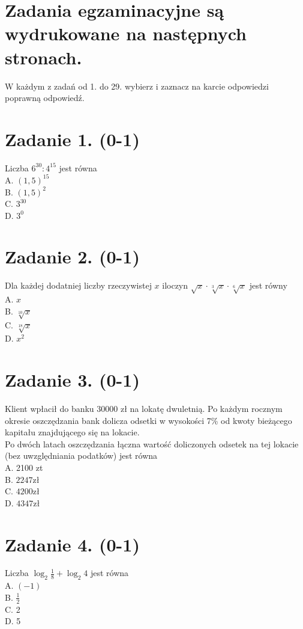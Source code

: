 \documentclass[10pt]{article}
\begin{document}
\section*{Zadania egzaminacyjne są wydrukowane na następnych stronach.}
W każdym z zadań od 1. do 29. wybierz i zaznacz na karcie odpowiedzi poprawną odpowiedź.

\section*{Zadanie 1. (0-1)}
Liczba \(6^{30}: 4^{15}\) jest równa\\
A. \((1,5)^{15}\)\\
B. \((1,5)^{2}\)\\
C. \(3^{30}\)\\
D. \(3^{0}\)

\section*{Zadanie 2. (0-1)}
Dla każdej dodatniej liczby rzeczywistej \(x\) iloczyn \(\sqrt{x} \cdot \sqrt[3]{x} \cdot \sqrt[6]{x}\) jest równy\\
A. \(x\)\\
B. \(\sqrt[10]{x}\)\\
C. \(\sqrt[18]{x}\)\\
D. \(x^{2}\)

\section*{Zadanie 3. (0-1)}
Klient wpłacił do banku 30000 zł na lokatę dwuletnią. Po każdym rocznym okresie oszczędzania bank dolicza odsetki w wysokości 7\% od kwoty bieżącego kapitału znajdującego się na lokacie.\\
Po dwóch latach oszczędzania łączna wartość doliczonych odsetek na tej lokacie (bez uwzględniania podatków) jest równa\\
A. 2100 zt\\
B. \(2247 \mathrm{zł}\)\\
C. \(4200 \mathrm{zł}\)\\
D. \(4347 \mathrm{zł}\)

\section*{Zadanie 4. (0-1)}
Liczba \(\log _{2} \frac{1}{8}+\log _{2} 4\) jest równa\\
A. \((-1)\)\\
B. \(\frac{1}{2}\)\\
C. 2\\
D. 5
\end{document}
